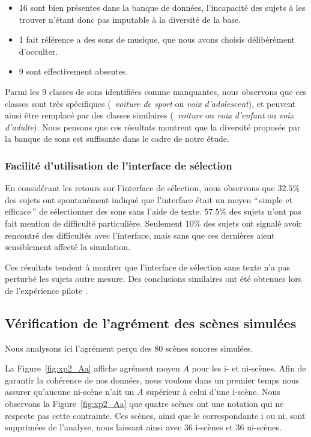 \begin{itemize}
\item  16 sont bien présentes dans la banque de données, l'incapacité des sujets à les trouver n'étant donc pas imputable à la diversité de la base.
\item 1 fait référence a des sons de musique, que nous avons choisis délibérément d'occulter.
\item 9 sont effectivement absentes.  
\end{itemize}

Parmi les 9 classes de sons identifiées comme manquantes, nous observons que ces classes sont très spécifiques (\eg~\emph{voiture de sport} ou \emph{voix d'adolescent}), et peuvent ainsi être remplacé par des classes similaires (\eg~\emph{voiture} ou \emph{voix d'enfant} ou \emph{voix d'adulte}). Nous pensons que ces résultats montrent que la diversité proposée par la banque de sons est suffisante dans le cadre de notre étude.

\subsubsection{Facilité d'utilisation de l'interface de sélection}

En considérant les retours sur l'interface de sélection, nous observons que $32.5\%$ des sujets ont spontanément indiqué que l'interface était un moyen ``\,simple et efficace\,'' de sélectionner des sons sans l'aide de texte. $57.5\%$ des sujets n'ont pas fait mention de difficulté particulière. Seulement $10\%$ des sujets ont signalé avoir rencontré des difficultés avec l'interface, mais sans que ces dernières aient sensiblement affecté la simulation.

Ces résultats tendent à montrer que l'interface de sélection sans texte n'a pas perturbé les sujets outre mesure. Des conclusions similaires ont été obtenues lors de l'expérience pilote \citep{lafay2013atiam,lafay2014new}. \\


\subsection{Vérification de l'agrément des scènes simulées}

Nous analysons ici l'agrément perçu des $80$ scènes sonores simulées. 

La Figure~\ref{fig:xp2_Aa} affiche agrément moyen $A$ pour les i- et ni-scènes. Afin de garantir la cohérence de nos données, nous voulons dans un premier temps nous assurer qu'aucune ni-scène n'ait un $A$ supérieur à celui d'une i-scène. Nous observons la Figure~\ref{fig:xp2_Aa} que quatre scènes ont une notation qui ne respecte pas cette contrainte. Ces scènes, ainsi que le correspondante i ou ni, sont supprimées de l'analyse, nous laissant ainsi avec 36 i-scènes et 36 ni-scènes.


